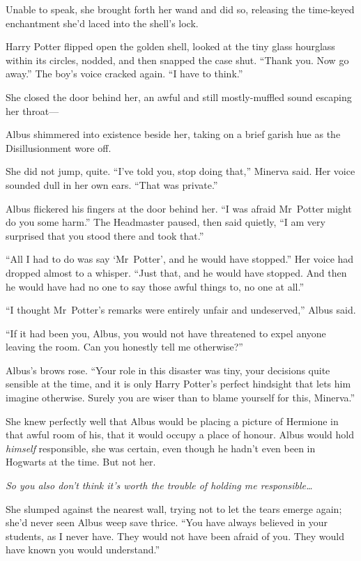 Unable to speak, she brought forth her wand and did so, releasing the time-keyed enchantment she’d laced into the shell’s lock.

Harry Potter flipped open the golden shell, looked at the tiny glass hourglass within its circles, nodded, and then snapped the case shut. “Thank you. Now go away.” The boy’s voice cracked again. “I have to think.”

\later

She closed the door behind her, an awful and still mostly-muffled sound escaping her throat—

Albus shimmered into existence beside her, taking on a brief garish hue as the Disillusionment wore off.

She did not jump, quite. “I’ve told you, stop doing that,” Minerva said. Her voice sounded dull in her own ears. “That was private.”

Albus flickered his fingers at the door behind her. “I was afraid Mr~Potter might do you some harm.” The Headmaster paused, then said quietly, “I am very surprised that you stood there and took that.”

“All I had to do was say ‘Mr~Potter’, and he would have stopped.” Her voice had dropped almost to a whisper. “Just that, and he would have stopped. And then he would have had no one to say those awful things to, no one at all.”

“I thought Mr~Potter’s remarks were entirely unfair and undeserved,” Albus said.

“If it had been you, Albus, you would not have threatened to expel anyone leaving the room. Can you honestly tell me otherwise?”

Albus’s brows rose. “Your role in this disaster was tiny, your decisions quite sensible at the time, and it is only Harry Potter’s perfect hindsight that lets him imagine otherwise. Surely you are wiser than to blame yourself for this, Minerva.”

She knew perfectly well that Albus would be placing a picture of Hermione in that awful room of his, that it would occupy a place of honour. Albus would hold \emph{himself} responsible, she was certain, even though he hadn’t even been in Hogwarts at the time. But not her.

\emph{So you also don’t think it’s worth the trouble of holding me responsible…}

She slumped against the nearest wall, trying not to let the tears emerge again; she’d never seen Albus weep save thrice. “You have always believed in your students, as I never have. They would not have been afraid of you. They would have known you would understand.”

